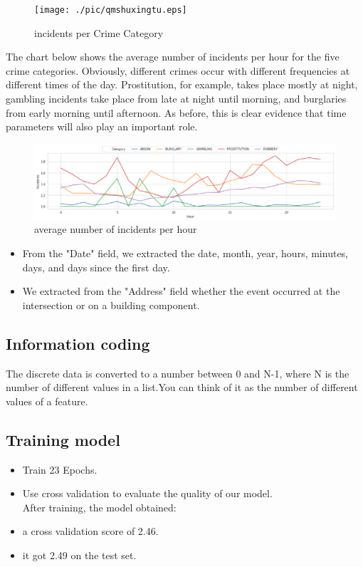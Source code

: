 \documentclass{amsart}
\begin{document}
\begin{figure}[htbp]
	\texttt{[image: ./pic/qmshuxingtu.eps]}
	\caption{incidents per Crime Category}
\end{figure}

	\hspace*{0.6cm}The chart below shows the average number of incidents per hour for the five crime categories.
	Obviously, different crimes occur with different frequencies at different times of the day.
	Prostitution, for example, takes place mostly at night, gambling incidents take place from late at night until morning, and burglaries from early morning until afternoon.
	As before, this is clear evidence that time parameters will also play an important role.
	
	\begin{figure}[htbp]
		\includegraphics[scale=0.7]{./pic/qmzhexiantu.eps}
		\caption{average number of incidents per hour}
	\end{figure}

	\begin{itemize}
	\item From the "Date" field, we extracted the date, month, year, hours, minutes, days, and days since the first day.
	\item We extracted from the "Address" field whether the event occurred at the intersection or on a building component.
\end{itemize}

\subsection{Information coding}
	The discrete data is converted to a number between 0 and N-1, where N is the number of different values in a list.You can think of it as the number of different values of a feature.\\

\subsection{Training model}
	\begin{itemize}
		\item Train 23 Epochs.
		\item Use cross validation to evaluate the quality of our model.\\
		After training, the model obtained:
		\item a cross validation score of 2.46.
		\item it got 2.49 on the test set.
	\end{itemize}
\end{document}
